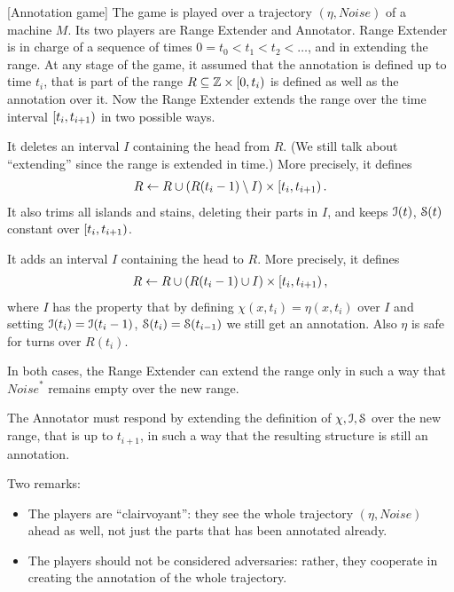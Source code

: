 \documentclass[11pt]{memoir}
\theoremstyle{definition} %
\newcommand{\Noise}{\mathit{Noise}}
\newcommand{\Rg}{R} %
\begin{document}
\begin{definition}\label{def:annotation-game}[Annotation game]
  The game is played over a trajectory \( (\eta,\Noise) \) of a machine \( M \).
  Its two players are Range Extender and Annotator.
  Range Extender is in charge of a sequence of times \( 0 = t_{0} < t_{1} < t_{2}<\dots \),
  and in extending the range.
  At any stage of the game, it assumed that the annotation is defined up to time \( t_{i} \),
  that is part of the range \( \Rg\subseteq\bbZ\times\lint{0}{t_{i}} \) is defined as well as
  the annotation over it.
  Now the Range Extender extends the range over the time interval \( \left[t_{i},t_{i+1}\right) \)
  in two possible ways.
  \begin{djenum}
  \item It deletes an interval \( I \) containing the head from \( \Rg \).
    (We still talk about ``extending'' since the range is extended in time.)
    More precisely, it defines
    \begin{align*}
   \Rg\gets \Rg\cup(\Rg(t_{i}-1)\setminus I)\times\lint{t_{i}}{t_{i+1}}.
    \end{align*}
    It also trims all islands and stains, deleting their parts in \( I \), and keeps
    \( \mathcal{I}(t) \), \( \mathcal{S}(t) \) constant over \( \left[t_{i},t_{i+1}\right) \).

  \item It adds an interval \( I \) containing the head to \( \Rg \).
    More precisely, it defines
    \begin{align*}
   \Rg\gets \Rg\cup(\Rg(t_{i}-1)\cup I)\times\lint{t_{i}}{t_{i+1}},
    \end{align*}
    where \( I \) has the property that by defining \( \chi(x,t_{i})=\eta(x,t_{i}) \) over \( I \)
    and setting \( \mathcal{I}(t_{i})=\mathcal{I}(t_{i}-1) \), \( \mathcal{S}(t_{i})=\mathcal{S}(t_{i-1}) \) we still get an annotation.
    Also \( \eta \) is safe for turns over \( \Rg(t_{i}) \).
  \end{djenum}
  In both cases, the Range Extender can extend the range only in such a way that
  \( \Noise^{*} \) remains empty over the new range.

  The Annotator must respond by extending the definition of \( \chi,\mathcal{I},\mathcal{S} \) over the
  new range, that is up to \( t_{i+1} \), in such a way that the resulting structure is still an
  annotation.
\end{definition}

Two remarks:
\begin{itemize}
\item The players are ``clairvoyant'': they see the whole trajectory
\( (\eta,\Noise) \) ahead as well, not just the parts that has been annotated already.
\item The players should not be considered adversaries: rather, they cooperate in creating
  the annotation of the whole trajectory.
\end{itemize}
\end{document}
